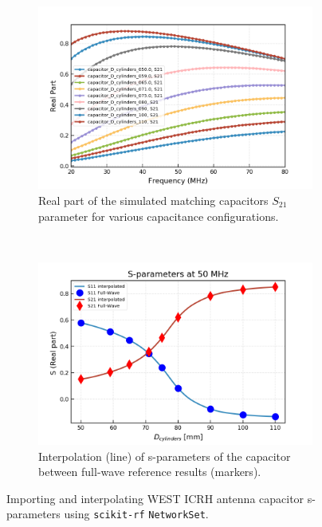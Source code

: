 \documentclass[%
aip,
cp,  %
amsmath,amssymb,%
reprint,%
]{revtex4-2}
\begin{document}
	\begin{figure}[t!]
		\centering
		\begin{subfigure}[t]{0.49\textwidth}
			\centering
			\includegraphics[width=.95\textwidth]{figures/capas_set_S21db}
			\caption{Real part of the simulated matching capacitors $S_{21}$ parameter for various capacitance configurations.}
		\end{subfigure}%
		~
		\begin{subfigure}[t]{0.49\textwidth}
			\centering
			\includegraphics[width=\linewidth]{figures/S11_S21_interpolated}
			\caption{Interpolation (line) of s-parameters of the capacitor between full-wave reference results (markers).}
		\end{subfigure}
		\caption{Importing and interpolating WEST ICRH antenna capacitor s-parameters using \texttt{scikit-rf} \texttt{NetworkSet}.}
		\label{fig:fig1}
	\end{figure}
	
\end{document}
